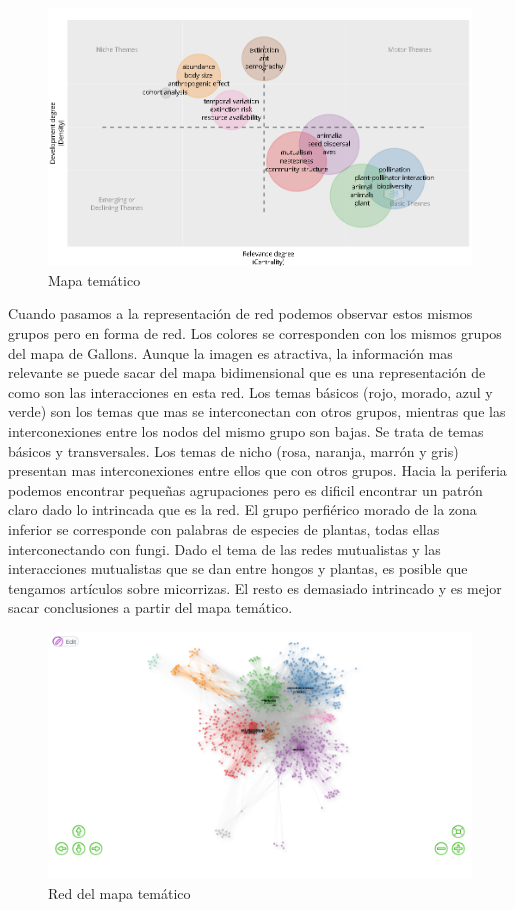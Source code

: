 \documentclass[
]{article}
\begin{document}
\begin{figure}
\centering
\includegraphics{ThematicMap.png}
\caption{Mapa temático}
\end{figure}

Cuando pasamos a la representación de red podemos observar estos mismos
grupos pero en forma de red. Los colores se corresponden con los mismos
grupos del mapa de Gallons. Aunque la imagen es atractiva, la
información mas relevante se puede sacar del mapa bidimensional que es
una representación de como son las interacciones en esta red. Los temas
básicos (rojo, morado, azul y verde) son los temas que mas se
interconectan con otros grupos, mientras que las interconexiones entre
los nodos del mismo grupo son bajas. Se trata de temas básicos y
transversales. Los temas de nicho (rosa, naranja, marrón y gris)
presentan mas interconexiones entre ellos que con otros grupos. Hacia la
periferia podemos encontrar pequeñas agrupaciones pero es dificil
encontrar un patrón claro dado lo intrincada que es la red. El grupo
perfiérico morado de la zona inferior se corresponde con palabras de
especies de plantas, todas ellas interconectando con fungi. Dado el tema
de las redes mutualistas y las interacciones mutualistas que se dan
entre hongos y plantas, es posible que tengamos artículos sobre
micorrizas. El resto es demasiado intrincado y es mejor sacar
conclusiones a partir del mapa temático.

\begin{figure}
\centering
\includegraphics{networkThematicMap.png}
\caption{Red del mapa temático}
\end{figure}
\end{document}
